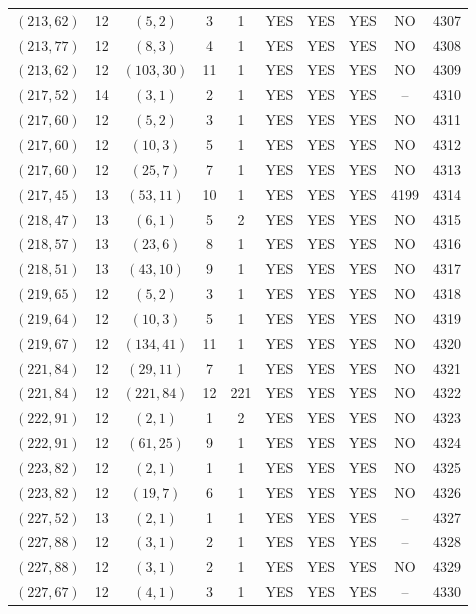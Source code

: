 \begin{longtable}{|c|c|c|c|c|c|c|c|c|c|}
$(213, 62)$ & 12 & $(5, 2)$ & 3 & 1 & YES & YES & YES & NO & 4307\\
$(213, 77)$ & 12 & $(8, 3)$ & 4 & 1 & YES & YES & YES & NO & 4308\\
$(213, 62)$ & 12 & $(103, 30)$ & 11 & 1 & YES & YES & YES & NO & 4309\\
$(217, 52)$ & 14 & $(3, 1)$ & 2 & 1 & YES & YES & YES & -- & 4310\\
$(217, 60)$ & 12 & $(5, 2)$ & 3 & 1 & YES & YES & YES & NO & 4311\\
$(217, 60)$ & 12 & $(10, 3)$ & 5 & 1 & YES & YES & YES & NO & 4312\\
$(217, 60)$ & 12 & $(25, 7)$ & 7 & 1 & YES & YES & YES & NO & 4313\\
$(217, 45)$ & 13 & $(53, 11)$ & 10 & 1 & YES & YES & YES & 4199 & 4314\\
$(218, 47)$ & 13 & $(6, 1)$ & 5 & 2 & YES & YES & YES & NO & 4315\\
$(218, 57)$ & 13 & $(23, 6)$ & 8 & 1 & YES & YES & YES & NO & 4316\\
$(218, 51)$ & 13 & $(43, 10)$ & 9 & 1 & YES & YES & YES & NO & 4317\\
$(219, 65)$ & 12 & $(5, 2)$ & 3 & 1 & YES & YES & YES & NO & 4318\\
$(219, 64)$ & 12 & $(10, 3)$ & 5 & 1 & YES & YES & YES & NO & 4319\\
$(219, 67)$ & 12 & $(134, 41)$ & 11 & 1 & YES & YES & YES & NO & 4320\\
$(221, 84)$ & 12 & $(29, 11)$ & 7 & 1 & YES & YES & YES & NO & 4321\\
$(221, 84)$ & 12 & $(221, 84)$ & 12 & 221 & YES & YES & YES & NO & 4322\\
$(222, 91)$ & 12 & $(2, 1)$ & 1 & 2 & YES & YES & YES & NO & 4323\\
$(222, 91)$ & 12 & $(61, 25)$ & 9 & 1 & YES & YES & YES & NO & 4324\\
$(223, 82)$ & 12 & $(2, 1)$ & 1 & 1 & YES & YES & YES & NO & 4325\\
$(223, 82)$ & 12 & $(19, 7)$ & 6 & 1 & YES & YES & YES & NO & 4326\\
$(227, 52)$ & 13 & $(2, 1)$ & 1 & 1 & YES & YES & YES & -- & 4327\\
$(227, 88)$ & 12 & $(3, 1)$ & 2 & 1 & YES & YES & YES & -- & 4328\\
$(227, 88)$ & 12 & $(3, 1)$ & 2 & 1 & YES & YES & YES & NO & 4329\\
$(227, 67)$ & 12 & $(4, 1)$ & 3 & 1 & YES & YES & YES & -- & 4330\\

\end{longtable}
